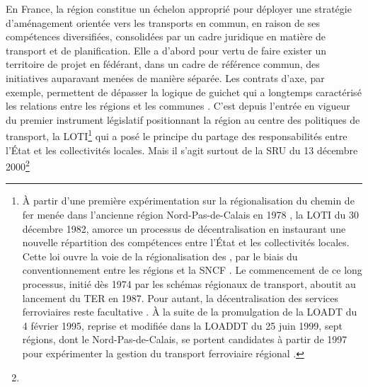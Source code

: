 \begin{refsegment}
En France, la région constitue un échelon approprié pour déployer une stratégie d'aménagement orientée vers les transports en commun, en raison de ses compétences diversifiées, consolidées par un cadre juridique en matière de transport et de planification. Elle a d'abord pour vertu de faire exister un territoire de projet en fédérant, dans un cadre de référence commun, des initiatives auparavant menées de manière séparée. Les contrats d’axe, par exemple, permettent de dépasser la logique de guichet qui a longtemps caractérisé les relations entre les régions et les communes \textcolor{blue}{\autocite[118]{bentayou_contrat_2015}}. C'est depuis l’entrée en vigueur du premier instrument législatif positionnant la région au centre des politiques de transport, la \acrfull{LOTI}\footnote{
    À partir d'une première expérimentation sur la régionalisation du chemin de fer menée dans l'ancienne région Nord-Pas-de-Calais en 1978 \textcolor{blue}{\autocites[I-3]{chauvineau_regionalisation_2001}[424]{passavant-guion_financer_2016}}, la \acrfull{LOTI} du 30 décembre 1982, amorce un processus de décentralisation en instaurant une nouvelle répartition des compétences entre l'État et les collectivités locales. Cette loi ouvre la voie de la régionalisation des , par le biais du conventionnement entre les régions et la SNCF \textcolor{blue}{\autocite[4]{deimon_projets_2024}}. Le commencement de ce long processus, initié dès 1974 par les schémas régionaux de transport, aboutit au lancement du \acrfull{TER} en 1987. Pour autant, la décentralisation des services ferroviaires reste facultative \textcolor{blue}{\autocite{commission_nationale_du_debat_public_chronologie_nodate}}. À la suite de la promulgation de la \acrfull{LOADT} du 4 février 1995, reprise et modifiée dans la \acrfull{LOADDT} du 25 juin 1999, sept régions, dont le Nord-Pas-de-Calais, se portent candidates à partir de 1997 pour expérimenter la gestion du transport ferroviaire régional \textcolor{blue}{\autocite[132]{burlando_regionalisation_2004}}.
} qui a posé le principe du partage des responsabilités entre l'État et les collectivités locales. Mais il s'agit surtout de la \acrfull{SRU} du 13 décembre 2000\footnote{
}
\end{refsegment}
